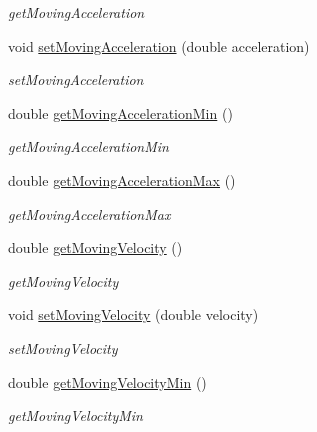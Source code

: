 \begin{DoxyCompactItemize}
\begin{DoxyCompactList}\small\item\em get\-Moving\-Acceleration \end{DoxyCompactList}\item 
void \hyperlink{classdrobot_1_1device_1_1actuator_1_1PhidgetAdvancedServo_af59f97b856409b73f8ae57c717f1dfc6}{set\-Moving\-Acceleration} (double acceleration)
\begin{DoxyCompactList}\small\item\em set\-Moving\-Acceleration \end{DoxyCompactList}\item 
double \hyperlink{classdrobot_1_1device_1_1actuator_1_1PhidgetAdvancedServo_a52fd8351e208581981108f59c1b17b27}{get\-Moving\-Acceleration\-Min} ()
\begin{DoxyCompactList}\small\item\em get\-Moving\-Acceleration\-Min \end{DoxyCompactList}\item 
double \hyperlink{classdrobot_1_1device_1_1actuator_1_1PhidgetAdvancedServo_ae9c5b626332ea58cf049182b9e52eeb7}{get\-Moving\-Acceleration\-Max} ()
\begin{DoxyCompactList}\small\item\em get\-Moving\-Acceleration\-Max \end{DoxyCompactList}\item 
double \hyperlink{classdrobot_1_1device_1_1actuator_1_1PhidgetAdvancedServo_aef1b6f210ae5171468867652998cb4f3}{get\-Moving\-Velocity} ()
\begin{DoxyCompactList}\small\item\em get\-Moving\-Velocity \end{DoxyCompactList}\item 
void \hyperlink{classdrobot_1_1device_1_1actuator_1_1PhidgetAdvancedServo_a8363d8d538a9614eef2d00a25f3384a6}{set\-Moving\-Velocity} (double velocity)
\begin{DoxyCompactList}\small\item\em set\-Moving\-Velocity \end{DoxyCompactList}\item 
double \hyperlink{classdrobot_1_1device_1_1actuator_1_1PhidgetAdvancedServo_a978e8a5aac7fa6dbff354b372bc7c55f}{get\-Moving\-Velocity\-Min} ()
\begin{DoxyCompactList}\small\item\em get\-Moving\-Velocity\-Min \end{DoxyCompactList}\item 

\end{DoxyCompactItemize}
